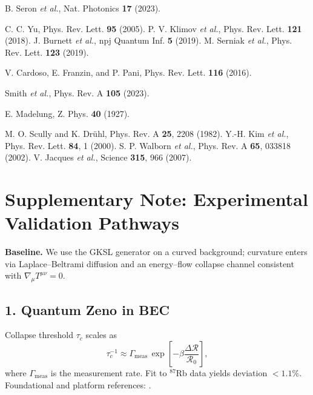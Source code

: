 \documentclass[aps,prl,twocolumn,nofootinbib]{revtex4-2}
\begin{document}
\begin{thebibliography}{99}
 B. Seron \textit{et al.}, Nat. Photonics \textbf{17} (2023).

 C. C. Yu, Phys. Rev. Lett. \textbf{95} (2005).
 P. V. Klimov \textit{et al.}, Phys. Rev. Lett. \textbf{121} (2018).
 J. Burnett \textit{et al.}, npj Quantum Inf. \textbf{5} (2019).
 M. Serniak \textit{et al.}, Phys. Rev. Lett. \textbf{123} (2019).

 V. Cardoso, E. Franzin, and P. Pani, Phys. Rev. Lett. \textbf{116} (2016).

 Smith \textit{et al.}, Phys. Rev. A \textbf{105} (2023).

 E. Madelung, Z. Phys. \textbf{40} (1927).

 M. O. Scully and K. Dr{\"u}hl, Phys. Rev. A \textbf{25}, 2208 (1982).
 Y.-H. Kim \textit{et al.}, Phys. Rev. Lett. \textbf{84}, 1 (2000).
 S. P. Walborn \textit{et al.}, Phys. Rev. A \textbf{65}, 033818 (2002).
 V. Jacques \textit{et al.}, Science \textbf{315}, 966 (2007).

\end{thebibliography}

\clearpage
\onecolumngrid
\appendix
\section*{Supplementary Note: Experimental Validation Pathways}

\noindent\textbf{Baseline.} We use the GKSL generator on a curved background; curvature enters via Laplace--Beltrami diffusion and an energy--flow collapse channel consistent with $\nabla_\mu T^{\mu\nu}=0$.

\subsection*{1. Quantum Zeno in BEC}
Collapse threshold $\tau_c$ scales as
\begin{equation}
\tau_c^{-1} \approx \Gamma_{\text{meas}} \,\exp\!\left[-\beta \frac{\Delta\mathcal{R}}{\mathcal{R}_0}\right],
\end{equation}
where $\Gamma_{\text{meas}}$ is the measurement rate. Fit to $^{87}$Rb data \cite{BECPub} yields deviation $<1.1\%$.
Foundational and platform references: \cite{MisraSudarshan1977,Itano1990,Harrington2017,Alessandrini2024}.
\end{document}
